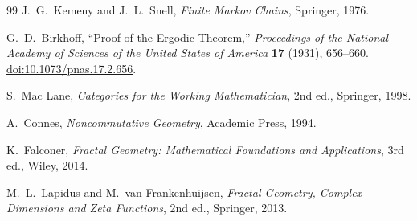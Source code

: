 \documentclass[a4paper,11pt]{ltjsarticle}
\theoremstyle{remark}
\begin{document}
\begin{thebibliography}{99}
J.~G.~Kemeny and J.~L.~Snell,
\textit{Finite Markov Chains},
Springer, 1976.

G.~D.~Birkhoff,
``Proof of the Ergodic Theorem,''
\textit{Proceedings of the National Academy of Sciences of the United States of America}
\textbf{17} (1931), 656--660.
\href{https://doi.org/10.1073/pnas.17.2.656}{doi:10.1073/pnas.17.2.656}.

S.~Mac Lane,
\textit{Categories for the Working Mathematician}, 2nd ed.,
Springer, 1998.

A.~Connes,
\textit{Noncommutative Geometry},
Academic Press, 1994.

K.~Falconer,
\textit{Fractal Geometry: Mathematical Foundations and Applications}, 3rd ed.,
Wiley, 2014.

M.~L.~Lapidus and M.~van Frankenhuijsen,
\textit{Fractal Geometry, Complex Dimensions and Zeta Functions}, 2nd ed.,
Springer, 2013.

\end{thebibliography}
\end{document}
